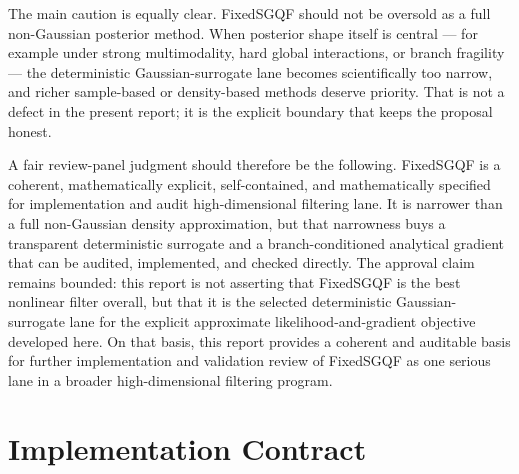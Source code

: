 \documentclass[11pt]{article}
\numberwithin{equation}{section}
\begin{document}
The main caution is equally clear.  FixedSGQF should not be oversold as a full
non-Gaussian posterior method.  When posterior shape itself is central --- for
example under strong multimodality, hard global interactions, or branch
fragility --- the deterministic Gaussian-surrogate lane becomes scientifically
too narrow, and richer sample-based or density-based methods deserve priority.
That is not a defect in the present report; it is the explicit boundary that
keeps the proposal honest.

A fair review-panel judgment should therefore be the following.  FixedSGQF is a
coherent, mathematically explicit, self-contained, and mathematically specified
for implementation and audit high-dimensional filtering lane.  It is narrower
than a full non-Gaussian density approximation, but that narrowness buys a
transparent deterministic surrogate and a branch-conditioned analytical gradient
that can be audited, implemented, and checked directly.  The approval claim
remains bounded: this report is not asserting that FixedSGQF is the best
nonlinear filter overall, but that it is the selected deterministic
Gaussian-surrogate lane for the explicit approximate likelihood-and-gradient
objective developed here.  On that basis, this report provides a coherent and
auditable basis for further implementation and validation review of FixedSGQF
as one serious lane in a broader high-dimensional filtering program.

\appendix
\section{Implementation Contract}
\label{sec:p31-implementation-contract}
\end{document}
